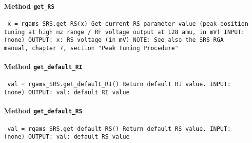 \paragraph{Method \texttt{get_RS}}
\vspace{1ex}
\texttt{\newline
x = rgams_SRS.get_RS(x)\newline
\newline
Get current RS parameter value (peak-position tuning at high mz range  / RF voltage output at 128 amu, in mV)\newline
\newline
INPUT:\newline
(none)\newline
\newline
OUTPUT:\newline
x: RS voltage (in mV)\newline
\newline
NOTE:\newline
See also the SRS RGA manual, chapter 7, section "Peak Tuning Procedure"\newline
\newline
}

\paragraph{Method \texttt{get_default_RI}}
\vspace{1ex}
\texttt{\newline
val = rgams_SRS.get_default_RI()\newline
\newline
Return default RI value.\newline
\newline
INPUT:\newline
(none)\newline
\newline
OUTPUT:\newline
val: default RI value\newline
\newline
}

\paragraph{Method \texttt{get_default_RS}}
\vspace{1ex}
\texttt{\newline
val = rgams_SRS.get_default_RS()\newline
\newline
Return default RS value.\newline
\newline
INPUT:\newline
(none)\newline
\newline
OUTPUT:\newline
val: default RS value\newline
\newline
}

